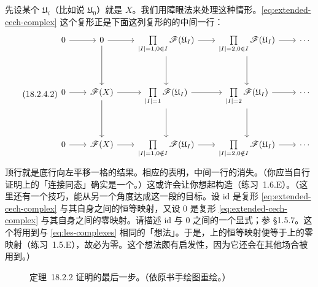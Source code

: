 先设某个 $\mathfrak{U}_i$（比如说 $\mathfrak{U}_0$）就是 $X$。我们用障眼法来处理这种情形。\eqref{eq:extended-cech-complex} 这个复形正是下面这列复形的\trShortExactSequence{}的中间一行：
\begin{equation*}\tag{18.2.4.2}\label{eq:sleight-short-exact}
\begin{tikzcd}[row sep=3.4em, column sep=2em]
0 \ar[r] & 0 \ar[r] \ar[d] & \prod\limits_{|I|=1,0\in I}\mathscr{F}(\mathfrak{U}_I) \ar[r] \ar[d] & \prod\limits_{|I|=2,0\in I}\mathscr{F}(\mathfrak{U}_I) \ar[r] \ar[d] & \cdots \\
0 \ar[r] & \mathscr{F}(X) \ar[r] \ar[d] & \prod\limits_{|I|=1}\mathscr{F}(\mathfrak{U}_I) \ar[r] \ar[d] & \prod\limits_{|I|=2}\mathscr{F}(\mathfrak{U}_I) \ar[r] \ar[d] & \cdots \\
0 \ar[r] & \mathscr{F}(X) \ar[r] & \prod\limits_{|I|=1,0\notin I}\mathscr{F}(\mathfrak{U}_I) \ar[r] & \prod\limits_{|I|=2,0\notin I}\mathscr{F}(\mathfrak{U}_I) \ar[r] & \cdots
\end{tikzcd}
\end{equation*}
顶行就是底行向左平移一格的结果。相应的\trCohomology{}\trLongExactSequence{}表明，中间一行的\trCohomology{}消失。（你应当自行证明\trCohomology{}上的「连接同态」确实是一个\trIsomorphism。）这或许会让你想起\trMappingCone{}构造（\mbox{练习~1.6.E}）。（这里还有一个技巧，能从另一个角度达成这一段的目标。设 $\mathrm{id}$ 是复形 \eqref{eq:extended-cech-complex} 与其自身之间的恒等映射，又设 $0$ 是复形 \eqref{eq:extended-cech-complex} 与其自身之间的零映射。请描述 $\mathrm{id}$ 与 $0$ 之间的一个显式\trHomotopy；参 \S1.5.7。这个\trHomotopy{}将用到与 \eqref{eq:les-complexes} 相同的「想法」。于是，\trHomology{}上的恒等映射便等于\trHomology{}上的零映射（\mbox{练习~1.5.E}），故\trHomology{}必为零。这个想法颇有启发性，因为它还会在其他场合被用到。）

\begin{figure}[htbp]
\centering
{}
\caption{\mbox{定理~18.2.2} 证明的最后一步。（依原书手绘图重绘。）}\label{fig:cech-final-step}
\end{figure}

